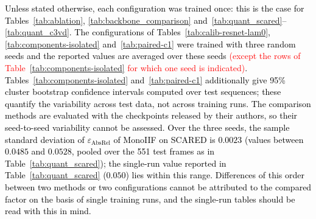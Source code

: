 \documentclass[a4paper,fleqn]{cas-dc}
\begin{document}
{\textcolor{black}
{
Unless stated otherwise, each configuration was trained once: this is the case for
Tables~\ref{tab:ablation}, \ref{tab:backbone_comparison} and~\ref{tab:quant_scared}--\ref{tab:quant_c3vd}.
The configurations of Tables~\ref{tab:calib-resnet-lam0}, \ref{tab:components-isolated}
and~\ref{tab:paired-c1} were trained with three random seeds and the reported values are averaged over these seeds \textcolor{red}{(except the rows of Table~\ref{tab:components-isolated} for which one seed is indicated)}. Tables~\ref{tab:components-isolated} and~\ref{tab:paired-c1} additionally
give 95\% cluster bootstrap confidence intervals computed over test sequences; these quantify the
variability across test data, not across training runs. The comparison methods are evaluated with
the checkpoints released by their authors, so their seed-to-seed variability cannot be assessed.
Over the three seeds, the sample standard deviation of $\varepsilon_\textrm{AbsRel}$ of MonoIIF on
SCARED is $0.0023$ (values between $0.0485$ and $0.0528$, pooled over the 551 test frames as in
Table~\ref{tab:quant_scared}); the single-run value reported in Table~\ref{tab:quant_scared}
($0.050$) lies within this range. Differences of this order between two methods or two
configurations cannot be attributed to the compared factor on the basis of single training runs,
and the single-run tables should be read with this in mind.}
}
\end{document}
